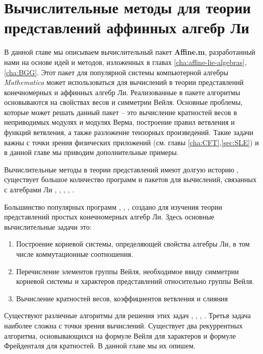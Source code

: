 \chapter{Вычислительные методы для теории представлений аффинных алгебр Ли}
\label{cha:computational-methods}

В данной главе мы описываем вычислительный пакет  {\bf Affine.m}, разработанный нами на основе идей и методов, изложенных в главах \ref{cha:affine-lie-algebras}, \ref{cha:BGG}. Этот пакет для популярной системы компьютерной алгебры {\it Mathematica} может использоваться для вычислений в теории представлений конечномерных и аффинных алгебр Ли. Реализованные в пакете алгоритмы основываются на свойствах весов и симметрии Вейля. Основные проблемы, которые может решать данный пакет -- это вычисление кратностей весов в неприводимых модулях и модулях Верма, построение правил ветвления и функций ветвления, а также разложение тензорных произведений. Такие задачи важны с точки зрения физических приложений (см. главы \ref{cha:CFT},\ref{sec:SLE}) и в данной главе мы приводим дополнительные примеры. 

Вычислительные методы в теории представлений имеют долгую историю \cite{belinfante1989survey}, существует большое количество программ и пакетов для вычислений, связанных с алгебрами Ли \cite{simplie}, \cite{vanleeuwen1994lsp}, \cite{stembridge1995mps,coxweyl}, \cite{fischbacher2002ilp}, \cite{Fuchs:1996dd}.

Большинство популярных программ \cite{simplie}, \cite{vanleeuwen1994lsp}, \cite{fischbacher2002ilp}, \cite{coxweyl} создано для изучения теории представлений простых конечномерных алгебр Ли. Здесь основные вычислительные задачи это:
\begin{enumerate}
\item Построение корневой системы, определяющей свойства алгебры Ли, в том числе коммутационные соотношения.
\item Перечисление элементов группы Вейля, необходимое ввиду симметрии корневой системы и характеров представлений относительно группы Вейля.
\item Вычисление кратностей весов, коэффициентов ветвления и слияния
\end{enumerate}
Существуют различные алгоритмы для решения этих задач \cite{moody1982fast}, \cite{stembridge2001computational}, \cite{belinfante1989survey}, \cite{casselman1994machine}.
Третья задача наиболее сложна с точки зрения вычислений. Существует два рекуррентных алгоритма, основывающихся на формуле Вейля для характеров и формуле Фрейденталя для кратностей. В данной главе мы их опишем.

